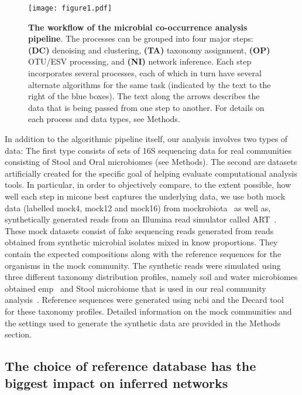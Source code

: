   \begin{figure}[h]
    \centering
    \texttt{[image: figure1.pdf]}
    \caption{
      \textbf{The workflow of the microbial co-occurrence analysis pipeline}.
      The processes can be grouped into four major steps: \textbf{(DC)} denoising and clustering, \textbf{(TA)} taxonomy assignment, \textbf{(OP)} OTU/ESV processing, and \textbf{(NI)} network inference.
      Each step incorporates several processes, each of which in turn have several alternate algorithms for the same task (indicated by the text to the right of the blue boxes).
      The text along the arrows describes the data that is being passed from one step to another. For details on each process and data types, see Methods.
    }
    \label{fig:figure1}
  \end{figure}

  In addition to the algorithmic pipeline itself, our analysis involves two types of data: The first type consists of sets of 16S sequencing data for real communities consisting of Stool and Oral microbiomes (see Methods).
  The second are datasets artificially created for the specific goal of helping evaluate computational analysis tools.
  In particular, in order to objectively compare, to the extent possible, how well each step in \ac{micone} best captures the underlying data, we use both mock data (labelled mock4, mock12 and mock16) from mockrobiota~\cite{Bokulich2016} as well as, synthetically generated reads from an Illumina read simulator called ART~\cite{Huang2012}.
  These mock datasets consist of fake sequencing reads generated from reads obtained from synthetic microbial isolates mixed in know proportions. They contain the expected compositions along with the reference sequences for the organisms in the mock community.
  The synthetic reads were simulated using three different taxonomy distribution profiles, namely soil and water microbiomes obtained \ac{emp}~\cite{Thompson2017} and Stool microbiome that is used in our real community analysis~\cite{Kang2017}.
  Reference sequences were generated using \ac{ncbi} and the Decard tool~\cite{Golob2017} for these taxonomy profiles.
  Detailed information on the mock communities and the settings used to generate the synthetic data are provided in the Methods section.


  \FloatBarrier

  \subsection*{The choice of reference database has the biggest impact on inferred networks}

